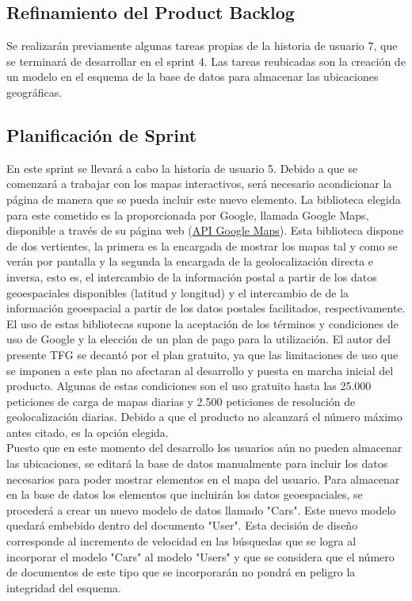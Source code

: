 	\subsection{Refinamiento del Product Backlog}
	Se realizarán previamente algunas tareas propias de la historia de usuario 7, que se terminará de desarrollar en el sprint 4. Las tareas reubicadas son la creación de un modelo en el esquema de la base de datos para almacenar las ubicaciones geográficas.
	
	\subsection{Planificación de Sprint}
	En este sprint se llevará a cabo la historia de usuario 5. Debido a que se comenzará a trabajar con los mapas interactivos, será necesario acondicionar la página de manera que se pueda incluir este nuevo elemento. La biblioteca elegida para este cometido es la proporcionada por Google, llamada Google Maps, disponible a través de su página web (\href{https://developers.google.com/maps/?hl=es}{API Google Maps}). Esta biblioteca dispone de dos vertientes, la primera es la encargada de mostrar los mapas tal y como se verán por pantalla y la segunda la encargada de la geolocalización directa e inversa, esto es, el intercambio de la información postal a partir de los datos geoespaciales disponibles (latitud y longitud) y el intercambio de de la información geoespacial a partir de los datos postales facilitados, respectivamente. El uso de estas bibliotecas supone la aceptación de los términos y condiciones de uso de Google y la elección de un plan de pago para la utilización. El autor del presente TFG se decantó por el plan gratuito, ya que las limitaciones de uso que se imponen a este plan no afectaran al desarrollo y puesta en marcha inicial del producto. Algunas de estas condiciones son el uso gratuito hasta las 25.000 peticiones de carga de mapas diarias y 2.500 peticiones de resolución de geolocalización diarias. Debido a que el producto no alcanzará el número máximo antes citado, es la opción elegida.\\
	Puesto que en este momento del desarrollo los usuarios aún no pueden almacenar las ubicaciones, se editará la base de datos manualmente para incluir los datos necesarios para poder mostrar elementos en el mapa del usuario. Para almacenar en la base de datos los elementos que incluirán los datos geoespaciales, se procederá a crear un nuevo modelo de datos llamado "Cars". Este nuevo modelo quedará embebido dentro del documento "User". Esta decisión de diseño corresponde al incremento de velocidad en las búsquedas que se logra al incorporar el modelo "Cars" al modelo "Users" y que se considera que el número de documentos de este tipo que se incorporarán no pondrá en peligro la integridad del esquema.
	
